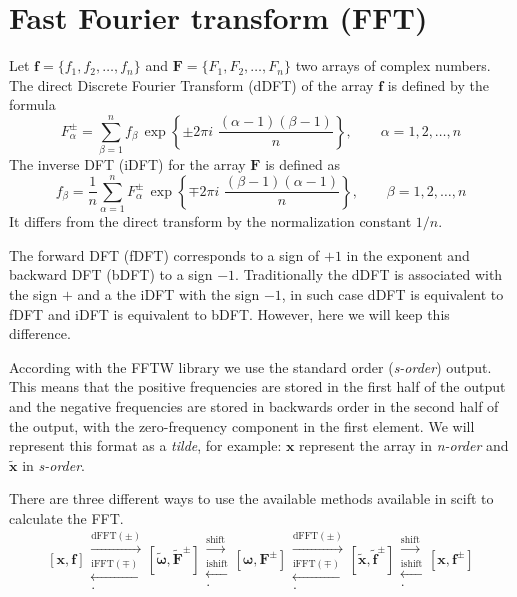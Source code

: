 \section{Fast Fourier transform (FFT)}

Let $\mathbf{f}=\{f_1,f_2,\ldots,f_n\}$ and $\mathbf{F}=\{F_1,F_2,\ldots,F_n\}$ two arrays of complex numbers.
The direct Discrete Fourier Transform (dDFT) of the array $\mathbf{f}$ is defined by the formula
\begin{equation}
F_\alpha^\pm = \sum_{\beta=1}^{n} f_\beta\,\exp\left\{\pm 2\pi i\,\,\frac{(\alpha-1)(\beta-1)}{n}\right\}, \qquad \alpha = 1, 2, \ldots, n
\end{equation}
The inverse DFT (iDFT) for the array $\mathbf{F}$ is defined as
\begin{equation}
f_\beta = \frac{1}{n}\sum_{\alpha=1}^{n} F_\alpha^\pm\,\exp\left\{\mp 2\pi i\,\,\frac{(\beta-1)(\alpha-1)}{n}\right\}, \qquad \beta = 1, 2, \ldots, n
\end{equation}
It differs from the direct transform by the normalization constant $1/n$.

The forward DFT (fDFT) corresponds to a sign of $+1$ in the exponent and backward DFT (bDFT) to a sign $-1$. Traditionally
the dDFT is associated with the sign $+$ and a the iDFT with the sign $-1$, in such case dDFT is equivalent to fDFT and
iDFT is equivalent to bDFT. However, here we will keep this difference.

According with the FFTW library we use the standard order (\textit{s-order}) output. This means that the
positive frequencies are stored in the first half of the output and the negative frequencies
are stored in backwards order in the second half of the output, with the zero-frequency component
in the first element. We will represent this format as a \textit{tilde}, for example: $\mathbf{x}$
represent the array in \textit{n-order} and $\mathbf{\tilde{x}}$ in \textit{s-order}.

There are three different ways to use the available methods available in scift
to calculate the FFT. 
\begin{equation}
\left[\mathbf{x},\mathbf{f}\right]
\mathrel{\substack{ \xrightarrow{\text{dFFT}(\pm)} \\ \xleftarrow{\text{iFFT}(\mp)} \\ . }}
\left[\boldsymbol{\tilde{\omega}},\mathbf{\tilde{F}}^\pm\right]
\mathrel{\substack{ \xrightarrow{\text{shift}} \\ \xleftarrow{\text{ishift}} \\ . }}
\left[\boldsymbol{\omega},\mathbf{F}^\pm\right]
\mathrel{\substack{ \xrightarrow{\text{dFFT}(\pm)} \\ \xleftarrow{\text{iFFT}(\mp)} \\ . }}
\left[\boldsymbol{\tilde{x}},\mathbf{\tilde{f}}^\pm\right]
\mathrel{\substack{ \xrightarrow{\text{shift}} \\ \xleftarrow{\text{ishift}} \\ . }}
\left[\boldsymbol{x},\mathbf{f}^\pm\right]
\end{equation}

